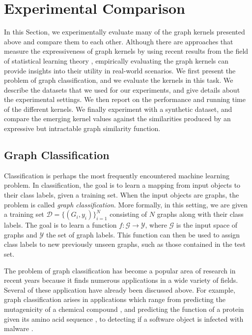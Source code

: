 \documentclass[twoside,11pt]{article}
\begin{document}
\section{Experimental Comparison}\label{sec:experiments}
In this Section, we experimentally evaluate many of the graph kernels presented above and compare them to each other.
Although there are approaches that measure the expressiveness of graph kernels by using recent results from the field of statistical learning theory , empirically evaluating the graph kernels can provide insights into their utility in real-world scenarios.
We first present the problem of graph classification, and we evaluate the kernels in this task.
We describe the datasets that we used for our experiments, and give details about the experimental settings.
We then report on the performance and running time of the different kernels.
We finally experiment with a synthetic dataset, and compare the emerging kernel values against the similarities produced by an expressive but intractable graph similarity function.

\subsection{Graph Classification}
Classification is perhaps the most frequently encountered machine learning problem.
In classification, the goal is to learn a mapping from input objects to their class labels, given a training set.
When the input objects are graphs, the problem is called \textit{graph classification}.
More formally, in this setting, we are given a training set $\mathcal{D} = \{ (G_i, y_i)\}_{i=1}^N$ consisting of $N$ graphs along with their class labels.
The goal is to learn a function $f : \mathcal{G} \rightarrow \mathcal{Y}$, where $\mathcal{G}$ is the input space of graphs and $\mathcal{Y}$ the set of graph labels.
This function can then be used to assign class labels to new previously unseen graphs, such as those contained in the test set.

The problem of graph classification has become a popular area of research in recent years because it finds numerous applications in a wide variety of fields.
Several of these application have already been discussed above.
For example, graph classification arises in applications which range from predicting the mutagenicity of a chemical compound , and predicting the function of a protein given its amino acid sequence , to detecting if a software object is infected with malware .
\end{document}
